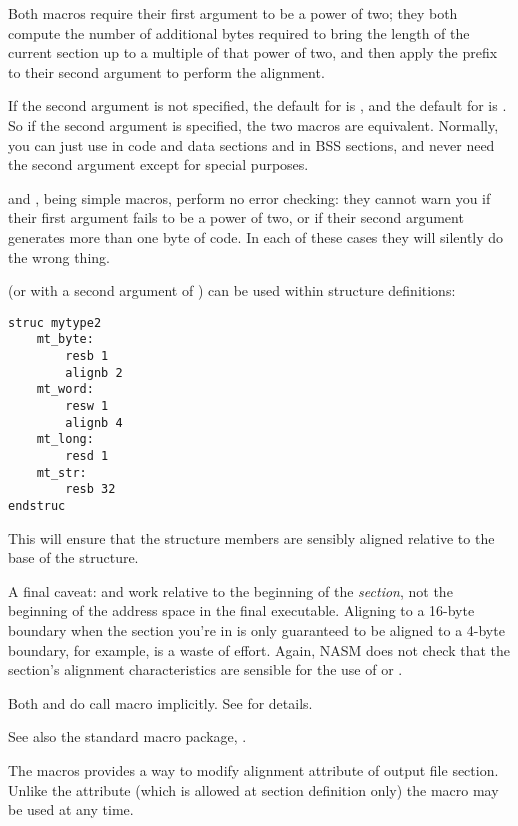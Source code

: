 Both macros require their first argument to be a power of two; they
both compute the number of additional bytes required to bring the
length of the current section up to a multiple of that power of two,
and then apply the  prefix to their second argument to
perform the alignment.

If the second argument is not specified, the default for 
is , and the default for  is .
So if the second argument is specified, the two macros are equivalent.
Normally, you can just use  in code and data sections and
 in BSS sections, and never need the second argument
except for special purposes.

 and , being simple macros, perform no error
checking: they cannot warn you if their first argument fails to be a
power of two, or if their second argument generates more than one
byte of code. In each of these cases they will silently do the wrong
thing.

 (or  with a second argument of )
can be used within structure definitions:

\begin{lstlisting}
struc mytype2
    mt_byte:
        resb 1
        alignb 2
    mt_word:
        resw 1
        alignb 4
    mt_long:
        resd 1
    mt_str:
        resb 32
endstruc
\end{lstlisting}

This will ensure that the structure members are sensibly aligned
relative to the base of the structure.

A final caveat:  and  work relative to the
beginning of the \emph{section}, not the beginning of the address space
in the final executable. Aligning to a 16-byte boundary when the
section you're in is only guaranteed to be aligned to a 4-byte
boundary, for example, is a waste of effort. Again, NASM does not
check that the section's alignment characteristics are sensible for
the use of  or .

Both  and  do call  macro implicitly.
See  for details.

See also the  standard macro package, .


The  macros provides a way to modify alignment attribute
of output file section. Unlike the  attribute (which is allowed
at section definition only) the  macro may be used at any time.

